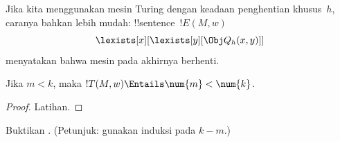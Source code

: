 \documentclass[../../../include/open-logic-section]{subfiles}
\begin{document}
Jika kita menggunakan mesin Turing dengan keadaan penghentian khusus~$h$,
caranya bahkan lebih mudah: !!{sentence}~$!E(M, w)$
\[
\lexists[x][\lexists[y][\Obj Q_h(x, y)]]
\]
menyatakan bahwa mesin pada akhirnya berhenti.

\begin{prop}
Jika $m < k$, maka $!T(M, w) \Entails \num{m} < \num{k}$.
\end{prop}

\begin{proof}
Latihan.
\end{proof}

\begin{prob}
Buktikan .
(Petunjuk: gunakan induksi pada $k-m$.)
\end{prob}
\end{document}
